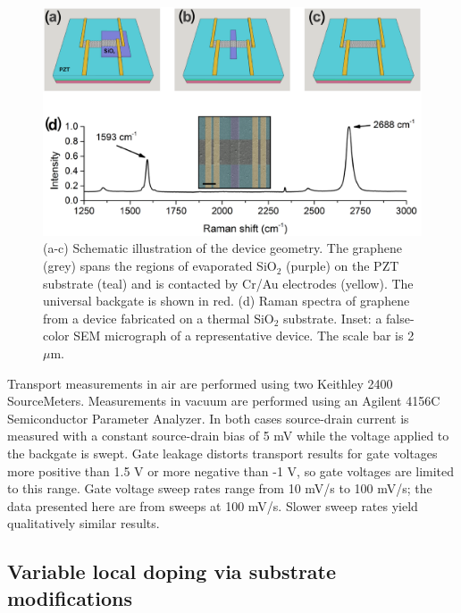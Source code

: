 \documentclass[edeposit,fullpage,draftthesis]{uiucthesis2009}
\begin{document}
\begin{figure}
  \centering
  \includegraphics[width=.8\textwidth]{images/resultsanddiscussion/pztpaper/figure1}
  \caption[Schematic illustration of graphene-ferroelectric pn junction device geometry]{
   (a-c) Schematic illustration of the device geometry. The graphene (grey) spans the regions of evaporated SiO$_2$ (purple) on the PZT substrate (teal) and is contacted by Cr/Au electrodes (yellow). The universal backgate is shown in red.
   (d) Raman spectra of graphene from a device fabricated on a thermal SiO$_2$ substrate. %
   Inset: a false-color SEM micrograph of a representative device. The scale bar is 2 $\mu$m.
  }
  \label{fig:devices}
\end{figure}

Transport measurements in air are performed using two Keithley 2400 SourceMeters. Measurements in vacuum are performed using an Agilent 4156C Semiconductor Parameter Analyzer. In both cases source-drain current is measured with a constant source-drain bias of 5 mV while the voltage applied to the backgate is swept. Gate leakage distorts transport results for gate voltages more positive than 1.5 V or more negative than -1 V, so gate voltages are limited to this range. Gate voltage sweep rates range from 10 mV/s to 100 mV/s; the data presented here are from sweeps at 100 mV/s. Slower sweep rates yield qualitatively similar results.


    \subsection{Variable local doping via substrate modifications}
    
\end{document}
